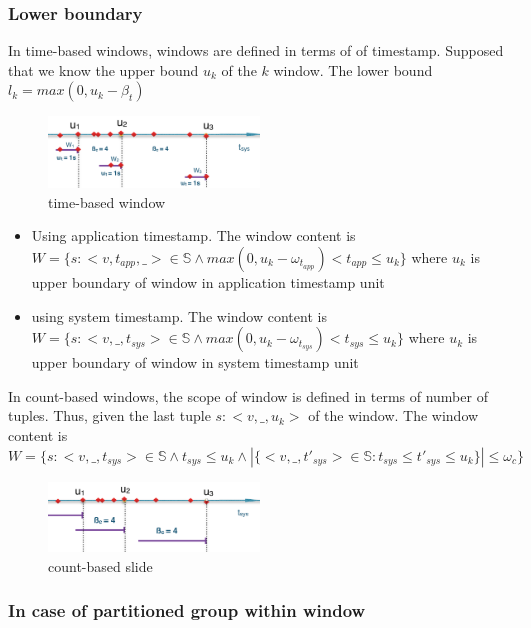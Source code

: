 \subsubsection{Lower boundary}

In time-based windows, windows are defined in terms of of timestamp. Supposed that we know the upper bound $u_k$ of the $k$ window. The lower bound $l_k = max(0, u_k - \beta_t)$

\begin{figure}[htbp!] 
\centering    
\includegraphics[width=0.5\textwidth]{timebased_window}
\caption{time-based window}
\label{fig:timebased_window}
\end{figure}

\begin{itemize}
\item Using application timestamp. The window content is $W = \{s:<v, t_{app},\_> \in \mathbb{S} \wedge max(0, u_k - \omega_{t_{app}}) < t_{app} \leq u_k\}$ where $u_k$ is upper boundary of window in application timestamp unit


\item using system timestamp. The window content is $W = \{s:<v,\_, t_{sys}> \in \mathbb{S} \wedge max (0, u_k - \omega_{t_{sys}}) < t_{sys} \leq u_k\}$ where $u_k$ is upper boundary of window in system timestamp unit
\end{itemize} 


In count-based windows, the scope of window is defined in terms of number of tuples. Thus, given the last tuple $s:<v, \_, u_k>$ of the window. The window content is 
$W=\{s:<v, \_, t_{sys}> \in \mathbb{S} \wedge t_{sys} \leq u_k \wedge  |\{<v,\_,t'_{sys}> \in \mathbb{S} : t_{sys} \leq t'_{sys} \leq u_k\}| \leq \omega_c \}$

\begin{figure}[htbp!] 
\centering    
\includegraphics[width=0.5\textwidth]{countbased_slide}
\caption{count-based slide}
\label{fig:countbased_slide}
\end{figure}


\subsubsection*{In case of partitioned group within window}

